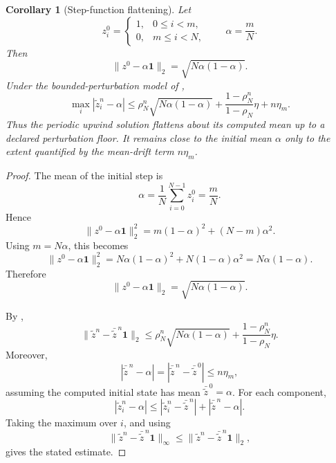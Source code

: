 \documentclass[pdflatex,sn-mathphys-num]{sn-jnl}%
\newtheorem{corollary}{Corollary}
\theoremstyle{thmstyleone}%
\theoremstyle{thmstyletwo}%
\theoremstyle{thmstylethree}%
\begin{document}
\begin{corollary}[Step-function flattening]
Let
\[
  z_i^0 =
  \begin{cases}
  1, & 0\le i<m,\\
  0, & m\le i<N,
  \end{cases}
  \qquad
  \alpha=\frac{m}{N}.
\]
Then
\[
  \|z^0-\alpha\mathbf 1\|_2
  =
  \sqrt{N\alpha(1-\alpha)}.
\]
Under the bounded-perturbation model of ,
\[
  \max_i|\tilde z_i^n-\alpha|
  \le
  \rho_N^n\sqrt{N\alpha(1-\alpha)}
  +
  \frac{1-\rho_N^n}{1-\rho_N}\eta
  +
  n\eta_m .
\]
Thus the periodic upwind solution flattens about its computed mean up to a
declared perturbation floor.  It remains close to the initial mean \(\alpha\)
only to the extent quantified by the mean-drift term \(n\eta_m\).
\end{corollary}

\begin{proof}
The mean of the initial step is
\[
  \alpha=\frac1N\sum_{i=0}^{N-1}z_i^0=\frac{m}{N}.
\]
Hence
\[
  \|z^0-\alpha\mathbf 1\|_2^2
  =
  m(1-\alpha)^2+(N-m)\alpha^2.
\]
Using \(m=N\alpha\), this becomes
\[
  \|z^0-\alpha\mathbf 1\|_2^2
  =
  N\alpha(1-\alpha)^2+N(1-\alpha)\alpha^2
  =
  N\alpha(1-\alpha).
\]
Therefore
\[
  \|z^0-\alpha\mathbf 1\|_2
  =
  \sqrt{N\alpha(1-\alpha)}.
\]

By ,
\[
  \|\tilde z^n-\bar{\tilde z}^{\,n}\mathbf 1\|_2
  \le
  \rho_N^n\sqrt{N\alpha(1-\alpha)}
  +
  \frac{1-\rho_N^n}{1-\rho_N}\eta .
\]
Moreover,
\[
  |\bar{\tilde z}^{\,n}-\alpha|
  =
  |\bar{\tilde z}^{\,n}-\bar{\tilde z}^{\,0}|
  \le
  n\eta_m,
\]
assuming the computed initial state has mean \(\bar{\tilde z}^{\,0}=\alpha\).
For each component,
\[
  |\tilde z_i^n-\alpha|
  \le
  |\tilde z_i^n-\bar{\tilde z}^{\,n}|
  +
  |\bar{\tilde z}^{\,n}-\alpha|.
\]
Taking the maximum over \(i\), and using
\[
  \|\tilde z^n-\bar{\tilde z}^{\,n}\mathbf 1\|_\infty
  \le
  \|\tilde z^n-\bar{\tilde z}^{\,n}\mathbf 1\|_2,
\]
gives the stated estimate.
\end{proof}
\end{document}
